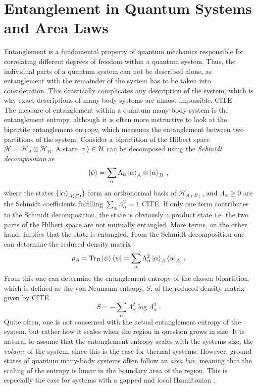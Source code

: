 \section{Entanglement in Quantum Systems and Area Laws}
Entanglement is a fundamental property of quantum mechanics responsible for correlating different degrees of freedom within a quantum system. Thus, the individual parts of a quantum system can not be described alone, as entanglement with the remainder of the system has to be taken into consideration. This drastically complicates any description of the system, which is why exact descriptions of many-body systems are almost impossible. CITE \\
The measure of entanglement within a quantum many-body system is the entanglement entropy, although it is often more instructive to look at the bipartite entanglement entropy, which measures the entanglement between two partitions of the system.
Consider a bipartition of the Hilbert space $\mathcal{H} = \mathcal{H}_A \otimes \mathcal{H}_B$. A state $\ket{\psi} \in \mathcal{H}$ can be decomposed using the \textit{Schmidt decomposition} as
\begin{equation}
	\ket{\psi} = \sum_{\alpha} \Lambda_{\alpha} \ket{\alpha}_A \otimes \ket{\alpha}_B \; ,
\end{equation}
where the states $\{ \ket{\alpha}_{A(B)} \}$ form an orthonormal basis of $\mathcal{H}_{A(B)}$, and $\Lambda_{\alpha} \ge 0$ are the Schmidt coefficients fulfilling $\sum_{\alpha} \Lambda_{\alpha}^2 = 1$ CITE. If only one term contributes to the Schmidt decomposition, the state is obviously a product state i.e. the two parts of the Hilbert space are not mutually entangled. More terms, on the other hand, implies that the state is entangled. From the Schmidt decomposition one can determine the reduced density matrix
\begin{equation}
	\rho_A = \Tr _B \ket{\psi}\bra{\psi} = \sum_{\alpha} \Lambda_{\alpha}^2 \ket{\alpha}_A \bra{\alpha}_A \; .  
\end{equation}
From this one can determine the entanglement entropy of the chosen bipartition, which is defined as the von-Neumann entropy, $S$, of the reduced density matrix given by CITE
\begin{equation}
	S = - \sum_{\alpha} \Lambda_{\alpha}^2 \log \Lambda_{\alpha}^2 \; .
\end{equation}
Quite often, one is not conserned with the actual entanglement entropy of the system, but rather how it scales when the region in question grows in size. It is natural to assume that the entanglement entropy scales with the systems size, the \textit{volume} of the system, since this is the case for thermal systems. However, ground states of quantum many-body systems often follow an \textit{area law}, meaning that the scaling of the entropy is linear in the boundary area of the region. This is especially the case for systems with a gapped and local Hamiltonian \cite{Cramer}.\\
